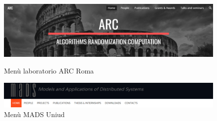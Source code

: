 \documentclass[target=bach,aauheader=]{thud}
\begin{document}
\begin{figure}
    \centering
    \begin{minipage}{1\textwidth}
      \centering
      \includegraphics[width=1\textwidth]{images/ARC-menu.png}
      \caption{Menù laboratorio ARC Roma}
    \end{minipage}
    \hspace{1cm}
    \hfill
    \begin{minipage}{1\textwidth}
      \centering
      \includegraphics[width=1\textwidth]{images/MADS-menu.png}
      \caption{Menù MADS Uniud}
    \end{minipage}
\end{figure}
\end{document}
